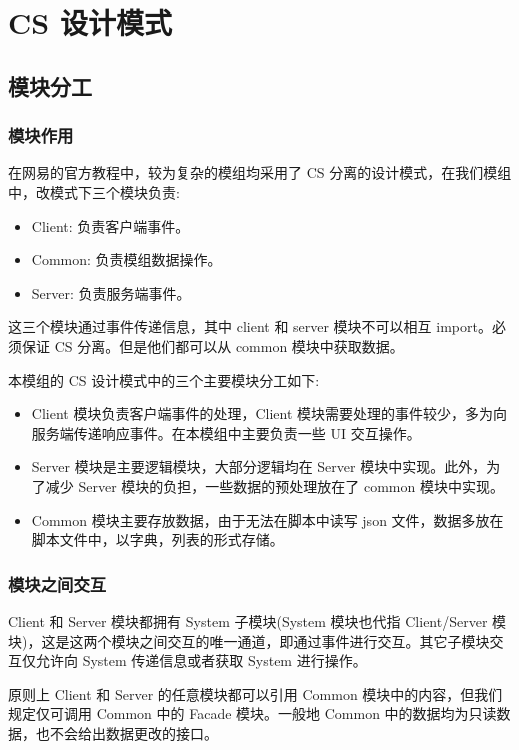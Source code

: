 \section{CS 设计模式}

\subsection{模块分工}

\subsubsection{模块作用}

在网易的官方教程中，较为复杂的模组均采用了 CS 分离的设计模式，在我们模组中，改模式下三个模块负责:
\begin{itemize}
    \item Client: 负责客户端事件。
    \item Common: 负责模组数据操作。
    \item Server: 负责服务端事件。
\end{itemize}

这三个模块通过事件传递信息，其中 client 和 server 模块不可以相互 import。必须保证 CS 分离。但是他们都可以从 common 模块中获取数据。

本模组的 CS 设计模式中的三个主要模块分工如下:
\begin{itemize}
    \item Client 模块负责客户端事件的处理，Client 模块需要处理的事件较少，多为向服务端传递响应事件。在本模组中主要负责一些 UI 交互操作。
    \item Server 模块是主要逻辑模块，大部分逻辑均在 Server 模块中实现。此外，为了减少 Server 模块的负担，一些数据的预处理放在了 common 模块中实现。
    \item Common 模块主要存放数据，由于无法在脚本中读写 json 文件，数据多放在脚本文件中，以字典，列表的形式存储。
\end{itemize}

\subsubsection{模块之间交互}

Client 和 Server 模块都拥有 System 子模块(System 模块也代指 Client/Server 模块)，这是这两个模块之间交互的唯一通道，即通过事件进行交互。其它子模块交互仅允许向 System 传递信息或者获取 System 进行操作。

原则上 Client 和 Server 的任意模块都可以引用 Common 模块中的内容，但我们规定仅可调用 Common 中的 Facade 模块。一般地 Common 中的数据均为只读数据，也不会给出数据更改的接口。

